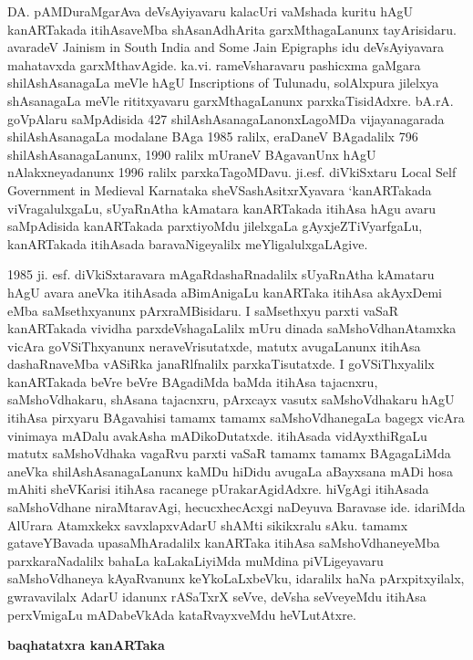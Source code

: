 \documentclass[11pt,a4size]{article}
\begin{document}
DA. pAMDuraMgarAva deVsAyiyavaru kalacUri vaMshada kuritu hAgU
kanARTakada itihAsaveMba shAsanA\-dhArita garxMthagaLanunx
tayArisidaru. avaradeV {\footnotesize{\rm{Jainism in South India and
      Some Jain Epigraphs}}} idu deVsAyiyavara mahatavxda
garxMthavAgide. ka.vi. rameVsharavaru pashicxma gaMgara
shilAshAsanagaLa meVle hAgU {\footnotesize{\rm{Inscriptions of
      Tulunadu}}}, solAlxpura jilelxya shAsanagaLa meVle rititxyavaru
garxMthagaLanunx parxkaTisidAdxre. bA.rA. goVpAlaru saMpAdisida 427
shilAshAsanagaLanonxLagoMDa vijayanagarada shilAshAsanagaLa modalane
BAga 1985 ralilx, eraDaneV BAgadalilx 796 shilAshAsanagaLanunx, 1990
ralilx mUraneV BAgavanUnx hAgU nAlakxneyadanunx 1996 ralilx
parxkaTagoMDavu. ji.esf. diVkiSxtaru {\footnotesize{\rm{Local Self
      Government in Medieval Karnataka}}} sheVSashAsitxrXyavara
`kanARTakada viVragalulxgaLu, sUyaRnAtha kAmatara kanARTakada itihAsa
hAgu avaru saMpAdisida kanARTakada parxtiyoMdu jilelxgaLa
gAyxjeZTiVyarfgaLu, kanARTakada itihAsada baravaNigeyalilx
meYligalulxgaLAgive.


1985 ji. esf. diVkiSxtaravara mAgaRdashaRnadalilx sUyaRnAtha kAmataru
hAgU avara aneVka itihAsada aBimAnigaLu kanARTaka itihAsa akAyxDemi
eMba saMsethxyanunx pArxraMBisidaru. I saMsethxyu parxti vaSaR
kanARTakada vividha parxdeVshagaLalilx mUru dinada saMshoVdhanAtamxka
vicAra goVSiThxyanunx neraveVrisutatxde, matutx avugaLanunx itihAsa
dashaRnaveMba vASiRka janaRlfnalilx parxkaTisutatxde. I goVSiThxyalilx
kanARTakada beVre beVre BAgadiMda baMda itihAsa tajacnxru,
saMshoVdhakaru, shAsana tajacnxru, pArxcayx vasutx saMshoVdhakaru hAgU
itihAsa pirxyaru BAgavahisi tamamx tamamx saMshoVdhanegaLa bagegx
vicAra vinimaya mADalu avakAsha mADikoDutatxde. itihAsada
vidAyxthiRgaLu matutx saMshoVdhaka vagaRvu parxti vaSaR tamamx tamamx
BAgagaLiMda aneVka shilAshAsanagaLanunx kaMDu hiDidu avugaLa aBayxsana
mADi hosa mAhiti sheVKarisi itihAsa racanege pUrakarAgidAdxre. hiVgAgi
itihAsada saMshoVdhane niraMtara\-vAgi, hecucxhecAcxgi naDeyuva Baravase
ide. idariMda AlUrara Atamxkekx savxlapxvAdarU shAMti sikikxralu
sAku. tamamx gataveYBavada upasaMhAradalilx kanARTaka itihAsa
saMshoVdhaneyeMba parxkaraNadalilx bahaLa kaLakaLi\-yiMda muMdina
piVLigeyavaru saMshoVdhaneya kAyaRvanunx keYkoLaLxbeVku, idaralilx
haNa pArxpitxyilalx, gwravavilalx AdarU idanunx rASaTxrX seVve, deVsha
seVveyeMdu itihAsa perxVmigaLu mADabeVkAda kataRvayxveMdu heVLutAtxre.

\bigskip
\centerline{\textbf{\Large{baqhatatxra kanARTaka}}}
\medskip
\end{document}
